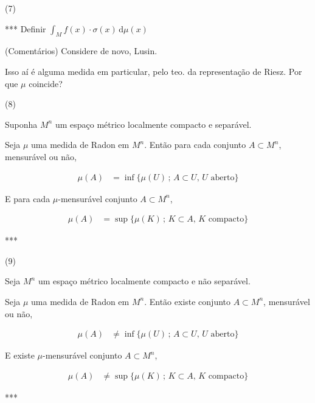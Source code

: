 \documentclass[12pt]{article}
\begin{document}
\vspace{3mm}

(7)

*** Definir $\int_M f(x) \cdot \sigma(x) \,\mathrm{d}\mu(x)$

\vspace{3mm}

(Coment\'arios) Considere de novo, Lusin.

Isso a\'i \'e alguma medida em particular, pelo teo. da representa\c{c}\~ao de Riesz. Por que $\mu$ coincide?

\vspace{3mm}

(8)

Suponha $M^n$ um espa\c{c}o m\'etrico localmente compacto e separ\'avel.

Seja $\mu$ uma medida de Radon em $M^n$. Ent\~ao para cada conjunto $A \subset M^n$, mensur\'avel ou n\~ao,

\begin{align}
\mu(A) &=  \inf \{ \mu(U)\,;\,A \subset U,\,U\text{ aberto} \}
\end{align}

E para cada $\mu$-mensur\'avel conjunto $A \subset M^n$,

\begin{align}
\mu(A) &=  \sup \{ \mu(K)\,;\,K \subset A,\,K\text{ compacto} \}
\end{align}

***

\vspace{100mm}

(9)

Seja $M^n$ um espa\c{c}o m\'etrico localmente compacto e n\~ao separ\'avel.

Seja $\mu$ uma medida de Radon em $M^n$. Ent\~ao existe conjunto $A \subset M^n$, mensur\'avel ou n\~ao,

\begin{align}
\mu(A) &\ne  \inf \{ \mu(U)\,;\,A \subset U,\,U\text{ aberto} \}
\end{align}

E existe $\mu$-mensur\'avel conjunto $A \subset M^n$,

\begin{align}
\mu(A) &\ne  \sup \{ \mu(K)\,;\,K \subset A,\,K\text{ compacto} \}
\end{align}

***

\vspace{3mm}
\end{document}
